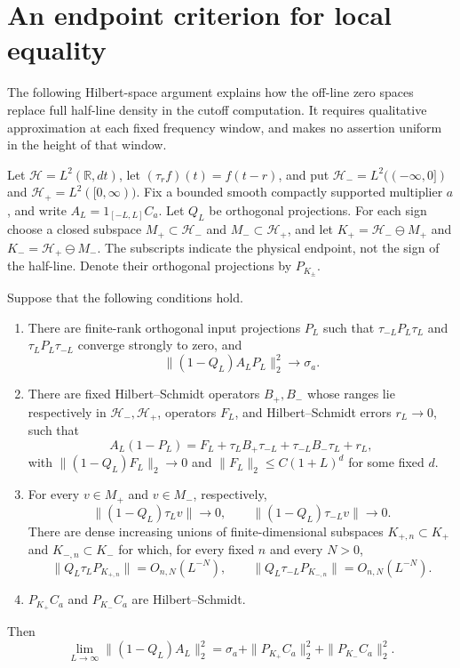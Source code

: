 \section{An endpoint criterion for local equality}

The following Hilbert-space argument explains how the off-line zero
spaces replace full half-line density in the cutoff computation.
It requires qualitative approximation at each fixed frequency window,
and makes no assertion uniform in the height of that window.

Let $\mathcal H=L^2(\mathbb R,dt)$, let
$(\tau_r f)(t)=f(t-r)$, and put
$\mathcal H_-=L^2(( -\infty,0])$ and
$\mathcal H_+=L^2([0,\infty))$.
Fix a bounded smooth compactly supported multiplier $a$, and write
$A_L=1_{[-L,L]}C_a$.  Let $Q_L$ be orthogonal projections.
For each sign choose a closed subspace
$M_+\subset\mathcal H_-$ and $M_-\subset\mathcal H_+$, and let
$K_+=\mathcal H_-\ominus M_+$ and
$K_-=\mathcal H_+\ominus M_-$.
The subscripts indicate the physical endpoint, not the sign of the
half-line.  Denote their orthogonal projections by $P_{K_\pm}$.

\begin{theorem}\label{thm:endpoint-local-criterion}
Suppose that the following conditions hold.

\begin{enumerate}
\item There are finite-rank orthogonal input projections $P_L$ such that
$\tau_{-L}P_L\tau_L$ and $\tau_LP_L\tau_{-L}$ converge strongly to zero,
and
\[
 \|(1-Q_L)A_LP_L\|_2^2\longrightarrow\sigma_a.
\]
\item There are fixed Hilbert--Schmidt operators $B_+,B_-$ whose ranges
lie respectively in $\mathcal H_-,\mathcal H_+$, operators $F_L$, and
Hilbert--Schmidt errors $r_L\to0$, such that
\begin{equation}\label{eq:endpoint-decomposition}
 A_L(1-P_L)=F_L+\tau_LB_+\tau_{-L}
                  +\tau_{-L}B_-\tau_L+r_L,
\end{equation}
with $\|(1-Q_L)F_L\|_2\to0$ and
$\|F_L\|_2\leq C(1+L)^d$ for some fixed $d$.
\item For every $v\in M_+$ and $v\in M_-$, respectively,
\[
 \|(1-Q_L)\tau_Lv\|\to0,\qquad
 \|(1-Q_L)\tau_{-L}v\|\to0.
\]
There are dense increasing unions of finite-dimensional subspaces
$K_{+,n}\subset K_+$ and $K_{-,n}\subset K_-$ for which, for every
fixed $n$ and every $N>0$,
\[
 \|Q_L\tau_LP_{K_{+,n}}\|=O_{n,N}(L^{-N}),\qquad
 \|Q_L\tau_{-L}P_{K_{-,n}}\|=O_{n,N}(L^{-N}).
\]
\item $P_{K_+}C_a$ and $P_{K_-}C_a$ are Hilbert--Schmidt.
\end{enumerate}
Then
\begin{equation}\label{eq:endpoint-local-conclusion}
 \lim_{L\to\infty}\|(1-Q_L)A_L\|_2^2
 =\sigma_a+\|P_{K_+}C_a\|_2^2+\|P_{K_-}C_a\|_2^2.
\end{equation}
\end{theorem}

